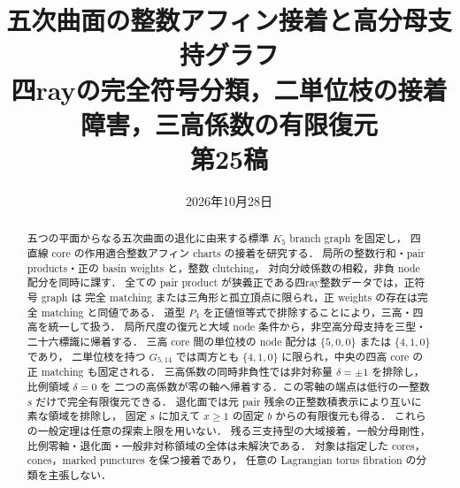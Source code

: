 \documentclass[11pt,a4paper]{article}
\title{五次曲面の整数アフィン接着と高分母支持グラフ\\[.4em]\large 四rayの完全符号分類，二単位枝の接着障害，三高係数の有限復元\\第25稿}
\author{}
\date{2026年10月28日}
\begin{document}
\maketitle
\begin{abstract}
五つの平面からなる五次曲面の退化に由来する標準 $K_5$ branch graph を固定し，
四直線 core の作用適合整数アフィン charts の接着を研究する．
局所の整数行和・pair products・正の basin weights と，整数 clutching，
対向分岐係数の相殺，非負 node 配分を同時に課す．
全ての pair product が狭義正である四ray整数データでは，正符号 graph は
完全 matching または三角形と孤立頂点に限られ，正 weights の存在は完全 matching と同値である．
道型 $P_4$ を正値恒等式で排除することにより，三高・四高を統一して扱う．
局所尺度の復元と大域 node 条件から，非空高分母支持を三型・二十六標識に帰着する．
三高 core 間の単位枝の node 配分は $\{5,0,0\}$ または $\{4,1,0\}$ であり，
二単位枝を持つ $G_{5,14}$ では両方とも $\{4,1,0\}$ に限られ，中央の四高 core の正 matching も固定される．
三高係数の同時非負性では非対称量 $\delta=\pm1$ を排除し，比例領域 $\delta=0$ を
二つの高係数が零の軸へ帰着する．この零軸の端点は低行の一整数 $s$ だけで完全有限復元できる．
退化面では元 pair 残余の正整数積表示により互いに素な領域を排除し，
固定 $s$ に加えて $x\ge1$ の固定 $b$ からの有限復元も得る．
これらの一般定理は任意の探索上限を用いない．
残る三支持型の大域接着，一般分母剛性，比例零軸・退化面・一般非対称領域の全体は未解決である．
対象は指定した cores，cones，marked punctures を保つ接着であり，
任意の Lagrangian torus fibration の分類を主張しない．
\end{abstract}
\tableofcontents


















\end{document}

